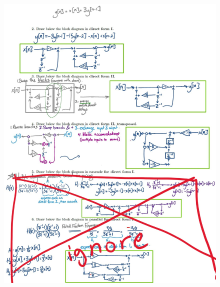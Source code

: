\documentclass{article}
\begin{document}
\begin{figure}[h!]
\begin{center}
    \includegraphics[width=0.99 \textwidth]{figures/Solutions pg 5 Real.jpg}
    \label{fig:old_solutions_5}
\end{center}
\end{figure}

\newpage
\end{document}
